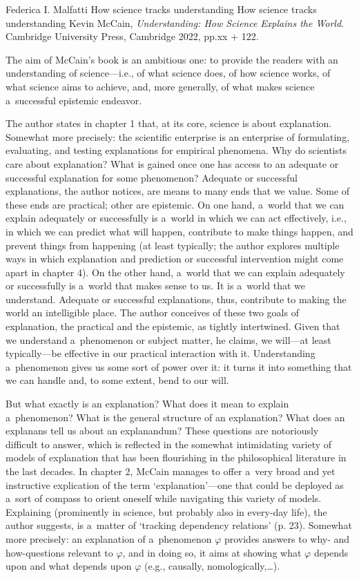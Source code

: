 \begin{recengenv}{Federica I. Malfatti}
	{How science tracks understanding}
	{How science tracks understanding}
	{Kevin McCain, \textit{Understanding: How Science Explains the World}. Cambridge University Press, Cambridge 2022, pp.xx + 122.}



\noindent The aim of McCain's book is an ambitious one: to provide the readers with an understanding of science---i.e., of what science does, of how science works, of what science aims to achieve, and, more generally, of what makes science a~successful epistemic endeavor.

The author states in chapter 1 that, at its core, science is about explanation. Somewhat more precisely: the scientific enterprise is an enterprise of formulating, evaluating, and testing explanations for empirical phenomena. Why do scientists care about explanation? What is gained once one has access to an adequate or successful explanation for some phenomenon? Adequate or successful explanations, the author notices, are means to many ends that we value. Some of these ends are practical; other are epistemic. On one hand, a~world that we can explain adequately or successfully is a~world in which we can act effectively, i.e., in which we can predict what will happen, contribute to make things happen, and prevent things from happening (at least typically; the author explores multiple ways in which explanation and prediction or successful intervention might come apart in chapter 4). On the other hand, a~world that we can explain adequately or successfully is a~world that makes sense to us. It is a~world that we understand. Adequate or successful explanations, thus, contribute to making the world an intelligible place. The author conceives of these two goals of explanation, the practical and the epistemic, as tightly intertwined. Given that we understand a~phenomenon or subject matter, he claims, we will---at least typically---be effective in our practical interaction with it. Understanding a~phenomenon gives us some sort of power over it: it turns it into something that we can handle and, to some extent, bend to our will.

But what exactly is an explanation? What does it mean to explain a~phenomenon? What is the general structure of an explanation? What does an explanans tell us about an explanandum? These questions are notoriously difficult to answer, which is reflected in the somewhat intimidating variety of models of explanation that has been flourishing in the philosophical literature in the last decades. In chapter 2, McCain manages to offer a~very broad and yet instructive explication of the term ‘explanation'---one that could be deployed as a~sort of compass to orient oneself while navigating this variety of models. Explaining (prominently in science, but probably also in every-day life), the author suggests, is a~matter of ‘tracking dependency relations' (p. 23). Somewhat more precisely: an explanation of a~phenomenon $\varphi$ provides answers to why- and how-questions relevant to $\varphi$, and in doing so, it aims at showing what $\varphi$ depends upon and what depends upon $\varphi$ (e.g., causally, nomologically,…).


\end{recengenv}
